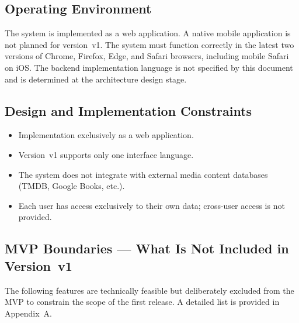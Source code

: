 \subsection{Operating Environment}

The system is implemented as a web application. A native mobile application is not planned for version~v1. The system must function correctly in the latest two versions of Chrome, Firefox, Edge, and Safari browsers, including mobile Safari on iOS. The backend implementation language is not specified by this document and is determined at the architecture design stage. 

\subsection{Design and Implementation Constraints}

\begin{itemize}
  \item Implementation exclusively as a web application.
  \item Version~v1 supports only one interface language.
  \item The system does not integrate with external media content databases (TMDB, Google Books, etc.).
  \item Each user has access exclusively to their own data; cross-user access is not provided.
\end{itemize}

\subsection{MVP Boundaries --- What Is Not Included in Version~v1}

The following features are technically feasible but deliberately excluded from the MVP to constrain the scope of the first release. A detailed list is provided in Appendix~A. 
